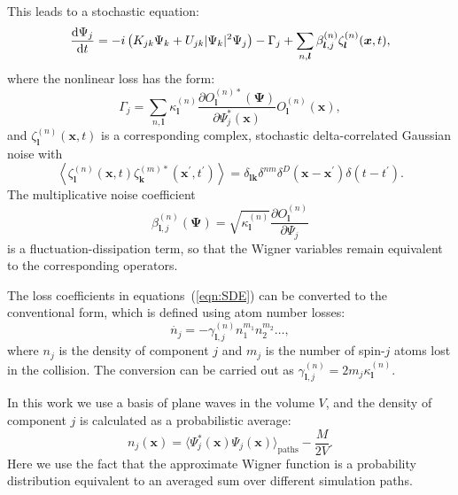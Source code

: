 \documentclass[doublecol]{epl2}
\newcommand{\xvec}{\boldsymbol{x}}
\newcommand{\kvec}{\boldsymbol{k}}
\newcommand{\lvec}{\boldsymbol{l}}
\newcommand{\Psivec}{\boldsymbol{\Psi}}
\begin{document}
This leads to a stochastic equation:
\begin{equation}
\label{eqn:SDE}
	\frac{\upd\Psi_j}{\upd t} =
		- i\left( K_{jk} \Psi_k + U_{jk} \lvert \Psi_k \rvert^{2} \Psi_j \right)
		- \Gamma_j
		+ \sum_{n,\lvec} \beta_{\lvec,j}^{(n)} \zeta_{\lvec}^{(n)}(\xvec,t),
\end{equation}
where the nonlinear loss has the form:
\begin{equation}
	\Gamma_j = \sum_{n,\lvec}
		\kappa_{\lvec}^{(n)}
		\frac{\partial O_{\lvec}^{(n)*} (\Psivec)}{\partial\Psi_j^{*} (\xvec)}
		O_{\lvec}^{(n)}(\xvec),
\end{equation}
and $\zeta_{\lvec}^{(n)}(\xvec, t)$ is a corresponding complex,
stochastic delta-correlated Gaussian noise with
\begin{equation}
	\left\langle
		\zeta_{\lvec}^{(n)} (\xvec,t) \zeta_{\kvec}^{(m)*}(\xvec^\prime, t^\prime)
	\right\rangle =
	\delta_{\lvec \kvec} \delta^{nm} \delta^{D} \left(
		\xvec - \xvec^\prime
	\right)
	\delta \left( t - t^\prime \right).
\end{equation}
The multiplicative noise coefficient
\begin{equation}
	\beta_{\lvec,j}^{(n)} \left( \Psivec \right) =
	\sqrt{\kappa_{\lvec}^{(n)}}
	\frac{\partial O_{\lvec}^{(n)}}{\partial\Psi_j}
\end{equation}
is a fluctuation-dissipation term,
so that the Wigner variables remain equivalent to the corresponding operators.

The loss coefficients in equations~(\ref{eqn:SDE}) can be converted to the conventional form,
which is defined using atom number losses:
\begin{equation}
	\dot{n_j} = - \gamma^{(n)}_{\lvec,j} n^{m_1}_1 n^{m_2}_2 \ldots ,
\end{equation}
where $n_j$ is the density of component $j$ and $m_j$
is the number of spin-$j$ atoms lost in the collision.
The conversion can be carried out as $\gamma^{(n)}_{\lvec,j} = 2 m_j \kappa^{(n)}_{\lvec}$.

In this work we use a basis of plane waves in the volume $V$,
and the density of component $j$ is calculated as a probabilistic average:
\begin{equation}
\label{eqn:wigner-density}
	n_j (\xvec)
		= \langle \Psi^*_j (\xvec) \Psi_j (\xvec) \rangle_{\mathrm{paths}} - \frac{M}{2V}.
\end{equation}
Here we use the fact that the approximate Wigner function is a probability distribution
equivalent to an averaged sum over different simulation paths.
\end{document}
